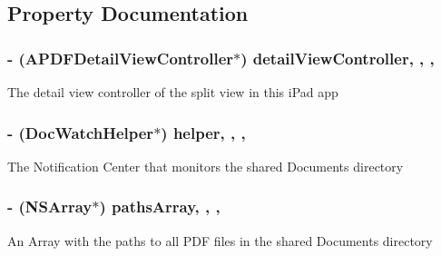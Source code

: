 \subsection{Property Documentation}
\hypertarget{interface_a_p_d_f_master_view_controller_a90fcd41e1231cd3413c9b0195dccca2e}{
\subsubsection[{detail\-View\-Controller}]{\setlength{\rightskip}{0pt plus 5cm}-\/ ({\bf A\-P\-D\-F\-Detail\-View\-Controller}$\ast$) detail\-View\-Controller\hspace{0.3cm}{\ttfamily [read]}, {\ttfamily [write]}, {\ttfamily [nonatomic]}, {\ttfamily [strong]}}}\label{interface_a_p_d_f_master_view_controller_a90fcd41e1231cd3413c9b0195dccca2e}
The detail view controller of the split view in this i\-Pad app \hypertarget{interface_a_p_d_f_master_view_controller_ac8517ec8e07d9227cc32bf3b6ddba3ae}{
\subsubsection[{helper}]{\setlength{\rightskip}{0pt plus 5cm}-\/ ({\bf Doc\-Watch\-Helper}$\ast$) helper\hspace{0.3cm}{\ttfamily [read]}, {\ttfamily [write]}, {\ttfamily [nonatomic]}, {\ttfamily [retain]}}}\label{interface_a_p_d_f_master_view_controller_ac8517ec8e07d9227cc32bf3b6ddba3ae}
The Notification Center that monitors the shared Documents directory \hypertarget{interface_a_p_d_f_master_view_controller_abd98ad58eefb1b1f67b81aefb3bf7cca}{
\subsubsection[{paths\-Array}]{\setlength{\rightskip}{0pt plus 5cm}-\/ (N\-S\-Array$\ast$) paths\-Array\hspace{0.3cm}{\ttfamily [read]}, {\ttfamily [write]}, {\ttfamily [nonatomic]}, {\ttfamily [retain]}}}\label{interface_a_p_d_f_master_view_controller_abd98ad58eefb1b1f67b81aefb3bf7cca}
An Array with the paths to all P\-D\-F files in the shared Documents directory 

